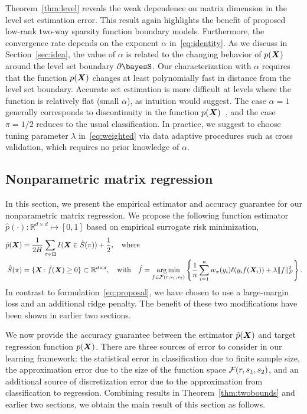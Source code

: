 \documentclass[12pt]{article}
\begin{document}
Theorem~\ref{thm:level} reveals the weak dependence on matrix dimension in the level set estimation error. This result again highlights the benefit of proposed low-rank two-way sparsity function boundary models. Furthermore, the convergence rate depends on the exponent $\alpha$ in~\eqref{eq:identity}.  As we discuss in Section~\ref{sec:idea}, the value of $\alpha$ is related to the changing behavior of $p(\bm X)$ around the level set boundary $\partial \bayesS$. Our characterization with $\alpha$ requires that the function $p(\bm X)$ changes at least polynomially fast in distance from the level set boundary. Accurate set estimation is more difficult at levels where the function is relatively flat (small $\alpha $), as intuition would suggest. The case $\alpha = 1$ generally corresponds to discontinuity in the function $p(\bm X)$~\citep{singh2009adaptive}, and the case $\pi = 1/2$ reduces to the usual classification. In practice, we suggest to choose tuning parameter $\lambda$ in~\eqref{eq:weighted} via data adaptive procedures such as cross validation, which requires no prior knowledge of $\alpha$.

\subsection{Nonparametric matrix regression}\label{subsec:pb3}
In this section, we present the empirical estimator and accuracy guarantee for our nonparametric matrix regression. We propose the following function estimator $\hat p(\cdot)\colon \mathbb{R}^{d\times d} \mapsto[0,1]$ based on empirical surrogate risk minimization, 
\begin{align}\label{eq:empirical}
\hat p(\bm X) &= {1\over 2H}  \sum_{\pi \in \Pi} I(\bm X\in \hat S(\pi))+{1\over 2}, \quad \text{where}\notag\\
\hat S(\pi) &= \{\bm X\colon\hat f(\bm X)\geq 0\}\subset\mathbb{R}^{d\times d},\quad  \text{with}\quad  \hat f= \operatorname*{arg\,min}_{f\in\mathcal{F}(r,s_1,s_2)}\left\{{1\over n}\sum_{i=1}^nw_\pi(y_i)\ell(y_if(\bm X_i))+\lambda\lVert f\rVert_F^2\right\}.
\end{align}
In contrast to formulation~\eqref{eq:proposal}, we have chosen to use a large-margin loss and an additional ridge penalty. The benefit of these two modifications have been shown in earlier two sections. 

We now provide the accuracy guarantee between the estimator $\hat p(\bm X)$ and target regression function $p(\bm X)$. There are three sources of error to consider in our learning framework: the statistical error in classification due to finite sample size, the approximation error due to the size of the function space $\mathcal{F}(r,s_1,s_2)$, and an additional source of discretization error due to the approximation from classification to regression. Combining results in Theorem~\ref{thm:twobounds} and earlier two sections, we obtain the main result of this section as follows. 
\end{document}

